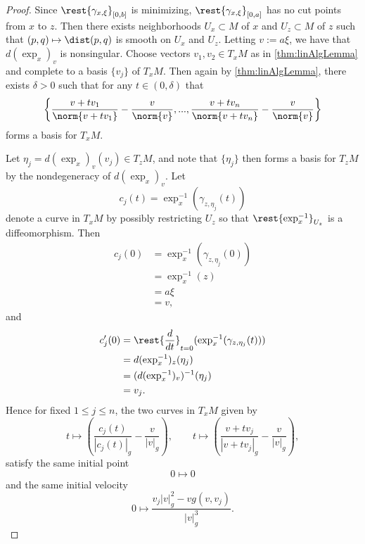 \begin{proof}
Since $\rest{\gamma_{x,\xi}}_{[0,b]}$ is minimizing, $\rest{\gamma_{x,\xi}}_{[0,a]}$ has no cut points from $x$ to $z$.  Then there exists neighborhoods $U_x\subset M$ of $x$ and $U_z\subset M$ of $z$ such that $(p,q)\mapsto\dist(p,q)$ is smooth on $U_x$ and $U_z$.  Letting $v:=a\xi$, we have that $d(\exp_x)_v$ is nonsingular.  Choose vectors $v_1,v_2\in T_xM$ as in \cref{thm:linAlgLemma} and complete to a basis $\{v_j\}$ of $T_xM$.  Then again by \cref{thm:linAlgLemma}, there exists $\delta>0$ such that for any $t\in(0,\delta)$ that
$$\left\{\frac{v+tv_1}{\norm{v+tv_1}}-\frac{v}{\norm{v}},...,\frac{v+tv_n}{\norm{v+tv_n}}-\frac{v}{\norm{v}}\right\}$$
forms a basis for $T_xM$.

Let $\eta_j=d(\exp_x)_v(v_j)\in T_zM$, and note that $\{\eta_j\}$ then forms a basis for $T_zM$ by the nondegeneracy of $d(\exp_x)_v$.  Let
$$c_j(t)=\exp_x^{-1}(\gamma_{z,\eta_j}(t))$$
denote a curve in $T_xM$ by possibly restricting $U_z$ so that $\rest{\exp_x^{-1}}_{U_z}$ is a diffeomorphism.  Then
\begin{align*}
	c_j(0)&=\exp_x^{-1}(\gamma_{z,\eta_j}(0))\\
	&=\exp_x^{-1}(z)\\
	&=a\xi\\
	&=v,
\end{align*}
and
\begin{align*}
	c_j'(0)&=\rest{\frac{d}{dt}}_{t=0}(\exp_x^{-1}(\gamma_{z,\eta_j}(t)))\\
	&=d(\exp_x^{-1})_z(\eta_j)\\
	&=(d(\exp_x^{-1})_v)^{-1}(\eta_j)\\
	&=v_j.
\end{align*}
Hence for fixed $1\leq j\leq n$, the two curves in $T_xM$ given by
$$t\mapsto\left(\frac{c_j(t)}{|c_j(t)|_g}-\frac{v}{|v|_g}\right),\qquad t\mapsto\left(\frac{v+tv_j}{|v+tv_j|_g}-\frac{v}{|v|_g}\right),$$
satisfy the same initial point
$$0\mapsto0$$
and the same initial velocity
$$0\mapsto\frac{v_j|v|_g^2-vg(v,v_j)}{|v|_g^3}.$$


\end{proof}
